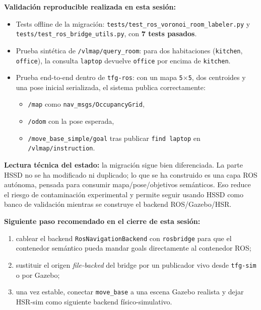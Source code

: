 \documentclass[11pt,a4paper]{article}
\begin{document}
\textbf{Validación reproducible realizada en esta sesión:}
\begin{itemize}
  \item Tests offline de la migración:
        \texttt{tests/test\_ros\_voronoi\_room\_labeler.py} y
        \texttt{tests/test\_ros\_bridge\_utils.py}, con \textbf{7 tests pasados}.
  \item Prueba sintética de \texttt{/vlmap/query\_room}: para dos habitaciones
        (\texttt{kitchen}, \texttt{office}), la consulta \texttt{laptop}
        devuelve \texttt{office} por encima de \texttt{kitchen}.
  \item Prueba end-to-end dentro de \texttt{tfg-ros}: con un mapa
        \texttt{5$\times$5}, dos centroides y una pose inicial serializada, el
        sistema publica correctamente:
        \begin{itemize}
          \item \texttt{/map} como \texttt{nav\_msgs/OccupancyGrid},
          \item \texttt{/odom} con la pose esperada,
          \item \texttt{/move\_base\_simple/goal} tras publicar
                \texttt{find laptop} en \texttt{/vlmap/instruction}.
        \end{itemize}
\end{itemize}

\textbf{Lectura técnica del estado:} la migración sigue bien diferenciada.
La parte HSSD no se ha modificado ni duplicado; lo que se ha construido es una
capa ROS autónoma, pensada para consumir mapa/pose/objetivos semánticos. Eso
reduce el riesgo de contaminación experimental y permite seguir usando HSSD
como banco de validación mientras se construye el backend ROS/Gazebo/HSR.

\textbf{Siguiente paso recomendado en el cierre de esta sesión:}
\begin{enumerate}
  \item cablear el backend \texttt{RosNavigationBackend} con
        \texttt{rosbridge} para que el contenedor semántico pueda mandar goals
        directamente al contenedor ROS;
  \item sustituir el origen \emph{file-backed} del bridge por un publicador vivo
        desde \texttt{tfg-sim} o por Gazebo;
  \item una vez estable, conectar \texttt{move\_base} a una escena Gazebo
        realista y dejar HSR-sim como siguiente backend físico-simulativo.
\end{enumerate}
\end{document}
